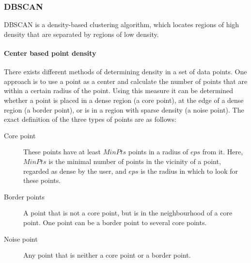 \subsubsection{DBSCAN}\label{clustering:DBSCAN}
DBSCAN is a density-based clustering algorithm, which locates regions of high density that are separated by regions of low density.


\paragraph{Center based point density}
There exists different methods of determining density in a set of data points.
One approach is to use a point as a center and calculate the number of points that are within a certain radius of the point.
Using this measure it can be determined whether a point is placed in a dense region (a core point), at the edge of a dense region (a border point), or is in a region with sparse density (a noise point).
The exact definition of the three types of points are as follows\cite{pang2006introduction}:

\begin{description}
\item[Core point] These points have at least $ MinPts $ points in a radius of $ eps $ from it.
Here, $ MinPts $ is the minimal number of points in the vicinity of a point, regarded as dense by the user, and $ eps $ is the radius in which to look for these points.

\item[Border points] A point that is not a core point, but is in the neighbourhood of a core point. 
One point can be a border point to several core points.

\item[Noise point] Any point that is neither a core point or a border point. 
\end{description}


